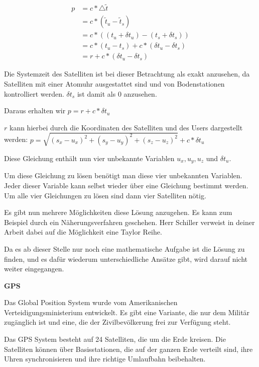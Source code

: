 \glqq 
\begin{align}
p &= c * \bigtriangleup \tilde{t} \\
  &= c * (\tilde{t}_{u} - \tilde{t}_{s}) \\
  &= c * ((t_{u} + \delta t_{u}) - (t_{s} + \delta t_{s})) \\
  &= c * (t_{u} - t_{s}) + c * (\delta t_{u} - \delta t_{s}) \\
  &= r + c * (\delta t_{u} - \delta t_{s})
\end{align}
\grqq \cite[S. 190]{Schiller2004}

Die Systemzeit des Satelliten ist bei dieser Betrachtung als exakt anzusehen, da Satelliten mit einer Atomuhr ausgestattet sind und von Bodenstationen kontrolliert werden. $\delta t_{s}$ ist damit als 0 anzusehen.

Daraus erhalten wir $p = r + c * \delta t_{u}$

$r$ kann hierbei durch die Koordinaten des Satelliten und des Users dargestellt werden: $p = \sqrt{(s_{x} - u_{x})^{2} + (s_{y} - u_{y})^{2} + (s_{z}-u_{z})^{2}} + c * \delta t_{u}$

Diese Gleichung enthält nun vier unbekannte Variablen $u_{x}, u_{y}, u_{z}$ und $\delta t_{u}$. 

Um diese Gleichung zu lösen benötigt man diese vier unbekannten Variablen. Jeder dieser Variable kann selbst wieder über eine Gleichung bestimmt werden. Um alle vier Gleichungen zu lösen sind dann vier Satelliten nötig. 

Es gibt nun mehrere Möglichkeiten diese Lösung anzugehen. Es kann zum Beispiel durch ein Näherungsverfahren geschehen. Herr Schiller verweist in deiner Arbeit dabei auf die Möglichkeit eine Taylor Reihe.

Da es ab dieser Stelle nur noch eine mathematische Aufgabe ist die Lösung zu finden, und es dafür wiederum unterschiedliche Ansätze gibt, wird darauf nicht weiter eingegangen.

\cite[S. 190]{Schiller2004}


\textbf{GPS}

Das Global Position System wurde vom Amerikanischen Verteidigungsministerium entwickelt. Es gibt eine Variante, die nur dem Militär zugänglich ist und eine, die der Zivilbevölkerung frei zur Verfügung steht. 

Das GPS System besteht auf 24 Satelliten, die um die Erde kreisen. Die Satelliten können über Basisstationen, die auf der ganzen Erde verteilt sind, ihre Uhren synchronisieren und ihre richtige Umlaufbahn beibehalten. 
\cite[S. 162]{Kuepper2005}


